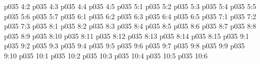 \vs p035 4:2 \pc 
\vs p035 4:3 
\vs p035 4:4 
\vs p035 4:5 \pc 
{}
\vs p035 5:1 
\vs p035 5:2 \pc 
\vs p035 5:3 \pc 
\vs p035 5:4 
\vs p035 5:5 
\vs p035 5:6 
\vs p035 5:7 
\vs p035 6:1 
\vs p035 6:2 
\vs p035 6:3 
\vs p035 6:4 
\vs p035 6:5 
\vs p035 7:1 
\vs p035 7:2 
\vs p035 7:3 
\vs p035 8:1 
\vs p035 8:2 
\vs p035 8:3 
\vs p035 8:4 
\vs p035 8:5 
\vs p035 8:6 
\vs p035 8:7 \pc 
\vs p035 8:8 
\vs p035 8:9 \pc 
\vs p035 8:10 
\vs p035 8:11 
\vs p035 8:12 
\vs p035 8:13 
\vs p035 8:14 
\vs p035 8:15 \pc 
{}
\vs p035 9:1 
\vs p035 9:2 
\vs p035 9:3 
\vs p035 9:4 
\vs p035 9:5 \pc 
\vs p035 9:6 
\vs p035 9:7 
\vs p035 9:8 
\vs p035 9:9 \pc 
\vs p035 9:10 
\vs p035 10:1 
\vs p035 10:2 
\vs p035 10:3 
\vs p035 10:4 \pc 
\vs p035 10:5 \pc 
\vsetoff
\vs p035 10:6 
\quizlink
